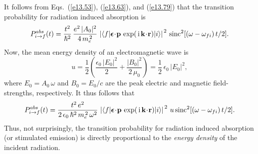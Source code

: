 It follows from Eqs.~(\ref{e13.53}), (\ref{e13.63}), and (\ref{e13.79})
that the transition probability for radiation induced absorption is
\begin{equation}
P_{i\rightarrow f}^{abs}(t) = \frac{t^2}{\hbar^2}\,\frac{e^2\,|A_0|^2}{4\,m_e^{\,2}}\,\left|\langle f|\mbox{\boldmath$\epsilon$}\!\cdot\!{\bf p}\,\exp(\,{\rm i}\,{\bf k}\!\cdot\!{\bf r})|i\rangle\right|^{\,2}\,{\rm sinc}^2[(\omega-\omega_{fi})\,t/2].
\end{equation}
Now, the mean energy density of an electromagnetic wave is
\begin{equation}
u = \frac{1}{2}\left(\frac{\epsilon_0\,|E_0|^2}{2}+ \frac{|B_0|^2}{2\,\mu_0}\right) = \frac{1}{2}\,\epsilon_0\,|E_0|^2,
\end{equation}
where $E_0=A_0\,\omega$ and $B_0=E_0/c$ are the peak electric
and magnetic field-strengths, respectively. It thus follows that
\begin{equation}\label{e13.80}
P_{i\rightarrow f}^{abs}(t) = \frac{t^2\,e^2}{2\,\epsilon_0\,\hbar^2\,m_e^{\,2}\,\omega^2}\,\left|\langle f|\mbox{\boldmath$\epsilon$}\!\cdot\!{\bf p}\,\exp(\,{\rm i}\,{\bf k}\!\cdot\!{\bf r})|i\rangle\right|^{\,2}\,u\,{\rm sinc}^2[(\omega-\omega_{fi})\,t/2].
\end{equation}
Thus, not surprisingly, the transition probability for radiation induced absorption (or stimulated emission) is directly proportional to the {\em energy
density}\/ of the incident radiation.

